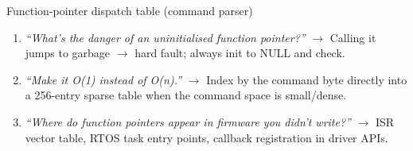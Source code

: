 \begin{gymproblem}{Function-pointer dispatch table (command parser)}
\followups
\begin{enumerate}
\item \emph{``What's the danger of an uninitialised function pointer?''}
  $\rightarrow$ Calling it jumps to garbage $\rightarrow$ hard fault; always
  init to NULL and check.
\item \emph{``Make it O(1) instead of O(n).''} $\rightarrow$ Index by the
  command byte directly into a 256-entry sparse table when the command space
  is small/dense.
\item \emph{``Where do function pointers appear in firmware you didn't
  write?''} $\rightarrow$ ISR vector table, RTOS task entry points, callback
  registration in driver APIs.
\end{enumerate}
\end{gymproblem}

